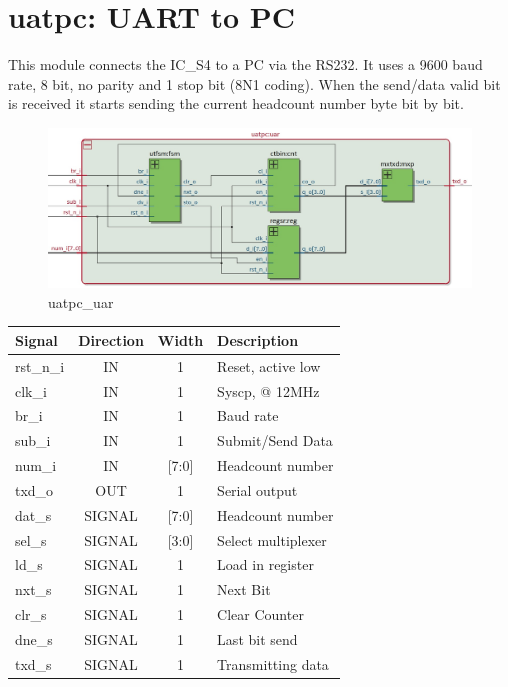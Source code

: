 \documentclass[12pt,a4 paper] {report}
\begin{document}
\section{uatpc: UART to PC}
This module connects the IC\_S4 to a PC via the RS232. It uses a 9600 baud rate, 8 bit, no parity and 1 stop bit (8N1 coding). When 
the send/data valid bit is received it starts sending the current headcount number byte bit by bit.
\begin{figure}[h]
	\centering	
	\includegraphics[scale=0.3]{../png/uatpc_uar.png}
	\caption{uatpc\_uar}
\end{figure}
\begin{center}
	\begin{tabular}{ | p{2cm} | c | c | p{5cm} |}
		\hline
		\textbf{Signal} & \textbf{Direction} & \textbf{Width} & \textbf{Description} \\
		\hline
		\hline
		rst\_n\_i & IN & 1 & Reset, active low\\
		\hline
		clk\_i & IN & 1 & Syscp, @ 12MHz \\
		\hline
		br\_i & IN & 1 & Baud rate \\
		\hline
		sub\_i & IN & 1 & Submit/Send Data \\
		\hline
		num\_i & IN & [7:0] & Headcount number \\
		\hline
		txd\_o & OUT & 1 & Serial output \\
		\hline
		\hline
		dat\_s & SIGNAL & [7:0] & Headcount number \\
		\hline	
		sel\_s & SIGNAL & [3:0] & Select multiplexer \\
		\hline 
		ld\_s & SIGNAL & 1 & Load in register \\
		\hline
		nxt\_s & SIGNAL & 1 & Next Bit \\
		\hline
		clr\_s & SIGNAL & 1 & Clear Counter \\
		\hline
		dne\_s & SIGNAL & 1 & Last bit send \\
		\hline
		txd\_s & SIGNAL & 1 & Transmitting data \\
		\hline
	\end{tabular}
\end{center}
\newpage
\end{document}
